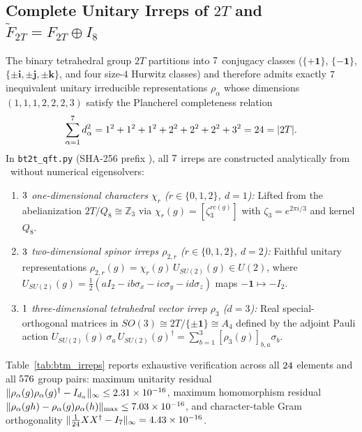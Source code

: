 \documentclass[aps,prx,twocolumn,superscriptaddress,nofootinbib]{revtex4-2}
\begin{document}
\subsection{Complete Unitary Irreps of $2T$ and $\widetilde{F}_{2T} = F_{2T} \oplus I_8$}
The binary tetrahedral group $2T$ partitions into $7$ conjugacy classes ($\{+\mathbf{1}\}$, $\{-\mathbf{1}\}$, $\{\pm\mathbf{i},\pm\mathbf{j},\pm\mathbf{k}\}$, and four size-$4$ Hurwitz classes) and therefore admits exactly $7$ inequivalent unitary irreducible representations $\rho_\alpha$ whose dimensions $(1,1,1,2,2,2,3)$ satisfy the Plancherel completeness relation
\begin{equation}
  \sum_{\alpha=1}^{7} d_\alpha^2 = 1^2 + 1^2 + 1^2 + 2^2 + 2^2 + 2^2 + 3^2 = 24 = |2T|.
  \label{eq:plancherel_dims}
\end{equation}
In \texttt{bt2t\_qft.py} (SHA-256 prefix \btmQftPySha), all $7$ irreps are constructed analytically from \btmEncVer\ without numerical eigensolvers:
\begin{enumerate}
  \item \emph{$3$ one-dimensional characters $\chi_r$ ($r \in \{0,1,2\}$, $d=1$):} Lifted from the abelianization $2T / Q_8 \cong \mathbb{Z}_3$ via $\chi_r(g) = [\zeta_3^{r c(g)}]$ with $\zeta_3 = e^{2\pi i/3}$ and kernel $Q_8$.
  \item \emph{$3$ two-dimensional spinor irreps $\rho_{2,r}$ ($r \in \{0,1,2\}$, $d=2$):} Faithful unitary representations $\rho_{2,r}(g) = \chi_r(g)\, U_{SU(2)}(g) \in U(2)$, where $U_{SU(2)}(g) = \tfrac{1}{2}(a I_2 - i b \sigma_x - i c \sigma_y - i d \sigma_z)$ maps $-\mathbf{1} \mapsto -I_2$.
  \item \emph{$1$ three-dimensional tetrahedral vector irrep $\rho_3$ ($d=3$):} Real special-orthogonal matrices in $SO(3) \cong 2T / \{\pm\mathbf{1}\} \cong A_4$ defined by the adjoint Pauli action $U_{SU(2)}(g)\,\sigma_a\,U_{SU(2)}(g)^\dagger = \sum_{b=1}^3 [\rho_3(g)]_{b,a}\sigma_b$.
\end{enumerate}

Table~\ref{tab:btm_irreps} reports exhaustive verification across all $24$ elements and all $576$ group pairs: maximum unitarity residual $\|\rho_\alpha(g)\rho_\alpha(g)^\dagger - I_{d_\alpha}\|_\infty \le 2.31 \times 10^{-16}$, maximum homomorphism residual $\|\rho_\alpha(gh) - \rho_\alpha(g)\rho_\alpha(h)\|_{\max} \le 7.03 \times 10^{-16}$, and character-table Gram orthogonality $\|\tfrac{1}{24} X X^\dagger - I_7\|_\infty = 4.43 \times 10^{-16}$.
\end{document}
